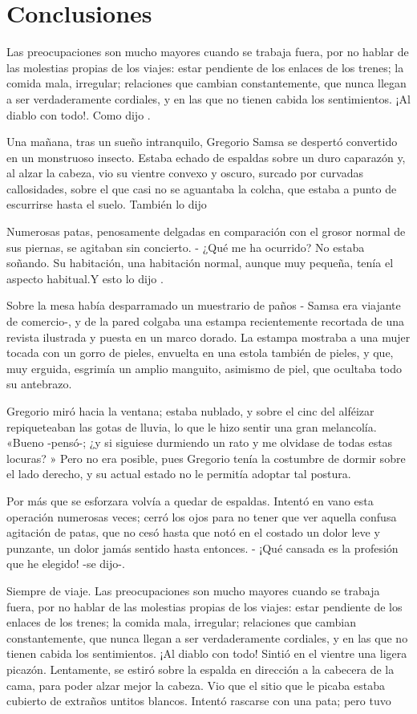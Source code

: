 \section{Conclusiones}

Las preocupaciones son mucho mayores cuando se trabaja fuera, por no hablar de las molestias propias de los viajes: estar pendiente de los enlaces de los trenes; la comida mala, irregular; relaciones que cambian constantemente, que nunca llegan a ser verdaderamente cordiales, y en las que no tienen cabida los sentimientos. ¡Al diablo con todo!. Como dijo \cite{ArgosyMedicalAnimation}.

Una mañana, tras un sueño intranquilo, Gregorio Samsa se despertó convertido en un monstruoso insecto. Estaba echado de espaldas sobre un duro caparazón y, al alzar la cabeza, vio su vientre convexo y oscuro, surcado por curvadas callosidades, sobre el que casi no se aguantaba la colcha, que estaba a punto de escurrirse hasta el suelo. También lo dijo \parencite{article-example,biber,biblatex}

Numerosas patas, penosamente delgadas en comparación con el grosor normal de sus piernas, se agitaban sin concierto. - ¿Qué me ha ocurrido? No estaba soñando. Su habitación, una habitación normal, aunque muy pequeña, tenía el aspecto habitual.Y esto lo dijo \textcite{guia1}.

Sobre la mesa había desparramado un muestrario de paños - Samsa era viajante de comercio-, y de la pared colgaba una estampa recientemente recortada de una revista ilustrada y puesta en un marco dorado. La estampa mostraba a una mujer tocada con un gorro de pieles, envuelta en una estola también de pieles, y que, muy erguida, esgrimía un amplio manguito, asimismo de piel, que ocultaba todo su antebrazo.

Gregorio miró hacia la ventana; estaba nublado, y sobre el cinc del alféizar repiqueteaban las gotas de lluvia, lo que le hizo sentir una gran melancolía. «Bueno -pensó-; ¿y si siguiese durmiendo un rato y me olvidase de todas estas locuras? » Pero no era posible, pues Gregorio tenía la costumbre de dormir sobre el lado derecho, y su actual estado no le permitía adoptar tal postura.

Por más que se esforzara volvía a quedar de espaldas. Intentó en vano esta operación numerosas veces; cerró los ojos para no tener que ver aquella confusa agitación de patas, que no cesó hasta que notó en el costado un dolor leve y punzante, un dolor jamás sentido hasta entonces. - ¡Qué cansada es la profesión que he elegido! -se dijo-.

Siempre de viaje. Las preocupaciones son mucho mayores cuando se trabaja fuera, por no hablar de las molestias propias de los viajes: estar pendiente de los enlaces de los trenes; la comida mala, irregular; relaciones que cambian constantemente, que nunca llegan a ser verdaderamente cordiales, y en las que no tienen cabida los sentimientos. ¡Al diablo con todo! Sintió en el vientre una ligera picazón. Lentamente, se estiró sobre la espalda en dirección a la cabecera de la cama, para poder alzar mejor la cabeza. Vio que el sitio que le picaba estaba cubierto de extraños untitos blancos. Intentó rascarse con una pata; pero tuvo